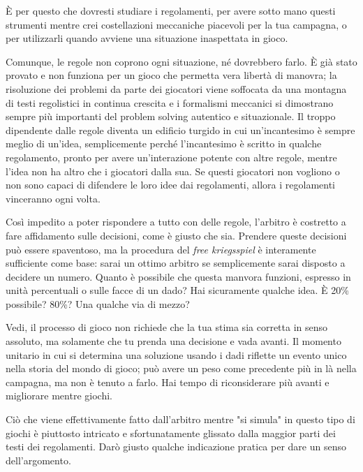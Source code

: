 È per questo che dovresti studiare i regolamenti, per avere sotto mano questi strumenti mentre crei costellazioni meccaniche piacevoli per la tua campagna, o per utilizzarli quando avviene una situazione inaspettata in gioco.


Comunque, le regole non coprono ogni situazione, né dovrebbero farlo. È già stato provato e non funziona per un gioco che permetta vera libertà di manovra; la risoluzione dei problemi da parte dei giocatori viene soffocata da una montagna di testi regolistici in continua crescita e i formalismi meccanici si dimostrano sempre più importanti del problem solving autentico e situazionale. Il \dnd{} troppo dipendente dalle regole diventa un edificio turgido in cui un'incantesimo è sempre meglio di un'idea, semplicemente perché l'incantesimo è scritto in qualche regolamento, pronto per avere un'interazione potente con altre regole, mentre l'idea non ha altro che i giocatori dalla sua. Se questi giocatori non vogliono o non sono capaci di difendere le loro idee dai regolamenti, allora i regolamenti vinceranno ogni volta.

Così impedito a poter rispondere a tutto con delle regole, l'arbitro è costretto a fare affidamento sulle decisioni, come è giusto che sia. Prendere queste decisioni può essere spaventoso, ma la procedura del \textit{free kriegsspiel} è interamente sufficiente come base: sarai un ottimo arbitro se semplicemente sarai disposto a decidere un numero. Quanto è possibile che questa manvora funzioni, espresso in unità percentuali o sulle facce di un dado? Hai sicuramente qualche idea. È 20\% possibile? 80\%? Una qualche via di mezzo?

Vedi, il processo di gioco non richiede che la tua stima sia corretta in senso assoluto, ma solamente che tu prenda una decisione e vada avanti. Il momento unitario in cui si determina una soluzione usando i dadi riflette un evento unico nella storia del mondo di gioco; può avere un peso come precedente più in là nella campagna, ma non è tenuto a farlo. Hai tempo di riconsiderare più avanti e migliorare mentre giochi.


Ciò che viene effettivamente fatto dall'arbitro mentre "si simula" in questo tipo di giochi è piuttosto intricato e sfortunatamente glissato dalla maggior parti dei testi dei regolamenti. Darò giusto qualche indicazione pratica per dare un senso dell'argomento.

